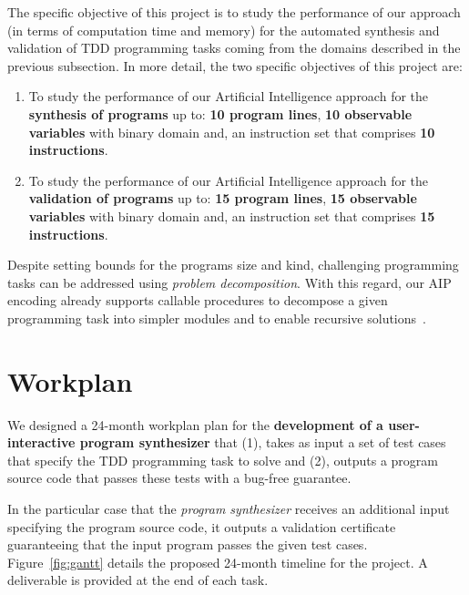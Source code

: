 \documentclass[10pt,a4paper]{paper}
\begin{document}
The specific objective of this project is to study the performance of our approach (in terms of computation time and memory) for the automated synthesis and validation of TDD programming tasks coming from the domains described in the previous subsection. In more detail, the two specific objectives of this project are:
\begin{enumerate}
\item To study the performance of our Artificial Intelligence approach for the {\bf synthesis of programs} up to: {\bf 10 program lines}, {\bf 10 observable variables} with binary domain and, an instruction set that comprises {\bf 10 instructions}. 
\item To study the performance of our Artificial Intelligence approach for the {\bf validation of programs} up to: {\bf 15 program lines}, {\bf 15 observable variables} with binary domain and, an instruction set that comprises {\bf 15 instructions}. 
\end{enumerate}

Despite setting bounds for the programs size and kind, challenging programming tasks can be addressed using {\em problem decomposition}. With this regard, our AIP encoding already supports callable procedures to decompose a given programming task into simpler modules and to enable recursive solutions~\cite{sergio:aprograming:icaps16,sergio:aprograming:ijcai16,segovia:FSC:JAIR2018,segovia:programs:AIJ19}.



\section{Workplan}
\label{sec:workplan}

We designed a 24-month workplan plan for the {\bf development of a user-interactive program synthesizer} that (1), takes as input a set of test cases that specify the TDD programming task to solve and (2), outputs a program source code that passes these tests with a bug-free guarantee.

In the particular case that the {\em program synthesizer} receives an additional input specifying the program source code, it outputs a validation certificate guaranteeing that the input program passes the given test cases. Figure~\ref{fig:gantt} details the proposed 24-month timeline for the project. A deliverable is provided at the end of each task.
\end{document}
